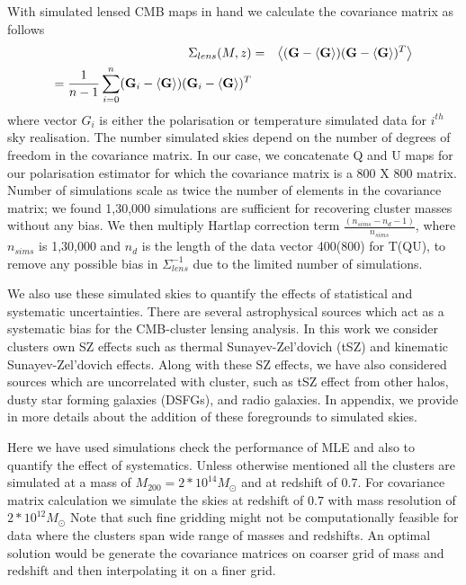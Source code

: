  
 With simulated lensed CMB maps in hand we calculate the covariance matrix as follows
 \begin{eqnarray}
\Sigma_{lens}(M,z) & = & \left<(\textrm{\textbf{G}} - \left<\textrm{\textbf{G}}\right>) (\textrm{\textbf{G}} - \left<\textrm{\textbf{G}}\right>)^{T}\right>\\
  =   \frac{1}{n-1}\sum\limits_{i = 0}^{n} (\textrm{\textbf{G}}_{i} - \left<\textrm{\textbf{G}}\right>) (\textrm{\textbf{G}}_{i} - \left<\textrm{\textbf{G}}\right>)^{T} %
\label{eq_lensed_cmb_cov_mass_z}
\end{eqnarray}
 where vector $G_{i}$ is either the polarisation or temperature simulated data for $i^{th}$ sky realisation. 
 The number simulated skies depend on the number of degrees of freedom in the covariance matrix. 
 In our case, we concatenate Q and U maps for our polarisation estimator for which the covariance matrix is a 800 X 800 matrix. 
 Number of simulations scale as twice the number of elements in the covariance matrix; we found 1,30,000 simulations are sufficient for recovering cluster masses without any bias. 
  We then multiply Hartlap correction term $\frac{(n_{sims} -n_{d} -1)}{n_{sims}}$, where $n_{sims}$ is 1,30,000 and $n_{d}$ is the length of the data vector 400(800) for T(QU), to remove any possible bias in $\Sigma^{-1}_{lens}$ due to the limited number of simulations. 
  
 We also use these simulated skies to quantify the effects of statistical and systematic uncertainties.
 There are several astrophysical sources which act as a systematic bias for the CMB-cluster lensing analysis. 
 In this work we consider clusters own SZ effects such as thermal Sunayev-Zel'dovich (tSZ) and kinematic Sunayev-Zel'dovich effects. 
 Along with these SZ effects, we have also considered sources which are uncorrelated with cluster, such as tSZ effect from other halos, dusty star forming galaxies (DSFGs), and radio galaxies.
 In appendix, we provide in more details about the addition of these foregrounds to simulated skies.
 
Here we have used simulations check the performance of MLE and also to quantify the effect of systematics. 
 Unless otherwise mentioned all the clusters are simulated at a mass of $M_{200} = 2*10^{14} M_{\odot}$ %
 and at redshift of 0.7.
 For covariance matrix calculation we simulate the skies at redshift of $0.7$ with mass resolution of $2*10^{12} M_{\odot}$
 Note that such fine gridding might not be computationally feasible for data where the clusters span wide range of masses and redshifts.
 An optimal solution would be generate the covariance matrices on coarser grid of mass and redshift and then interpolating it on a finer grid.

